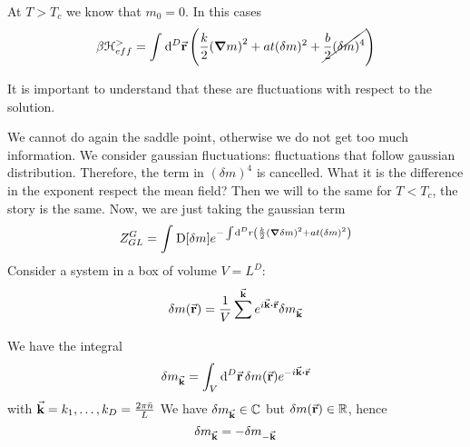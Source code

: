 \documentclass[../main/main.tex]{subfiles}
\begin{document}
At \( T > T_c \) we know that \( m_0 = 0 \).
In this cases
\begin{equation}
  \beta \mathcal{H}_{eff}^> = \int_{}^{} \dd[D]{\va{r}} \qty(\frac{k}{2} \qty(\grad m)^2 + a t (\delta m)^2 + \cancel{\frac{b}{2} (\delta m)^4} )
\end{equation}
\begin{remark}
It is important to understand that these are fluctuations with respect to the solution.
\end{remark}
We cannot do again the saddle point, otherwise we do not get too much information.
We consider gaussian fluctuations: fluctuations that follow gaussian distribution.
Therefore, the term in \( (\delta m)^4 \)  is cancelled.
What it is the difference in the exponent respect the mean field?
Then we will to the same for \( T < T_c \), the story is the same. Now, we are just taking the gaussian term
\begin{equation}
  Z_{GL}^G = \int_{}^{} \text{D} \qty[\delta m] e^{- \int_{}^{} \dd[D]{r} \qty(\frac{k}{2} \qty(\grad \delta m)^2 + a t (\delta m)^2  )  }
 \end{equation}
Consider a system in a box of volume \( V = L^D \):
\begin{equation}
  \delta m (\va{r}) = \frac{1}{V} \sum_{}^{\va{k}}  e^{i \va{k}\vdot \va{r}} \delta m_{\va{k}}
\end{equation}
We have the integral
\begin{equation}
  \delta m_{\va{k}} = \int_{V}^{} \dd[D]{\va{r}} \delta m (\va{r}) e^{-i \va{k} \vdot \va{r} }
\end{equation}
with \( \va{k} = k_1, \dots, k_D = \frac{2 \pi  \bar{n} }{L}\)
We have \( \delta m_{\va{k}} \in \mathbb{C} \) but \( \delta m (\va{r}) \in \mathbb{R} \), hence
\begin{equation}
  \delta m_{\va{k}} = - \delta m_{-\va{k}}
\end{equation}
\end{document}
